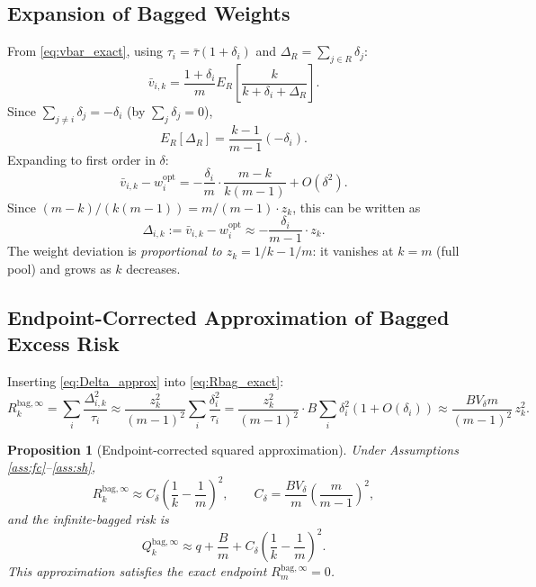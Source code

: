 \documentclass[12pt,a4paper]{article}
\newtheorem{proposition}{Proposition}
\theoremstyle{definition}
\begin{document}
\subsection{Expansion of Bagged Weights}

From \eqref{eq:vbar_exact}, using $\tau_i=\bar\tau(1+\delta_i)$ and
$\Delta_R=\sum_{j\in R}\delta_j$:
\begin{equation}
\bar v_{i,k} = \frac{1+\delta_i}{m}E_R\!\left[\frac{k}{k+\delta_i+\Delta_R}\right].
\end{equation}
Since $\sum_{j\neq i}\delta_j=-\delta_i$ (by $\sum_j\delta_j=0$),
\begin{equation}
E_R[\Delta_R] = \frac{k-1}{m-1}(-\delta_i).
\end{equation}
Expanding to first order in $\delta$:
\begin{equation}\label{eq:bagged_weight_expansion}
\bar v_{i,k} - w_i^{\mathrm{opt}}
= -\frac{\delta_i}{m}\cdot\frac{m-k}{k(m-1)} + O(\delta^2).
\end{equation}
Since $(m-k)/(k(m-1))=m/(m-1)\cdot z_k$, this can be written as
\begin{equation}\label{eq:Delta_approx}
\Delta_{i,k} := \bar v_{i,k} - w_i^{\mathrm{opt}}
\approx -\frac{\delta_i}{m-1}\cdot z_k.
\end{equation}
The weight deviation is \emph{proportional to $z_k=1/k-1/m$}: it vanishes
at $k=m$ (full pool) and grows as $k$ decreases.

\subsection{Endpoint-Corrected Approximation of Bagged Excess Risk}

Inserting \eqref{eq:Delta_approx} into \eqref{eq:Rbag_exact}:
\begin{equation}
R_k^{\mathrm{bag},\infty}
= \sum_i\frac{\Delta_{i,k}^2}{\tau_i}
\approx \frac{z_k^2}{(m-1)^2}\sum_i\frac{\delta_i^2}{\tau_i}
= \frac{z_k^2}{(m-1)^2}\cdot B\sum_i\delta_i^2(1+O(\delta_i))
\approx \frac{BV_\delta m}{(m-1)^2}\,z_k^2.
\end{equation}

\begin{proposition}[Endpoint-corrected squared approximation]\label{prop:smallhet}
Under Assumptions \ref{ass:fc}--\ref{ass:sh},
\begin{equation}\label{eq:Rapprox}
R_k^{\mathrm{bag},\infty} \approx C_\delta\!\left(\frac{1}{k}-\frac{1}{m}\right)^{\!2},
\qquad C_\delta = \frac{BV_\delta}{m}\!\left(\frac{m}{m-1}\right)^{\!2},
\end{equation}
and the infinite-bagged risk is
\begin{equation}\label{eq:Qbag_approx}
Q_k^{\mathrm{bag},\infty} \approx q + \frac{B}{m} + C_\delta\!\left(\frac{1}{k}-\frac{1}{m}\right)^{\!2}.
\end{equation}
This approximation satisfies the exact endpoint $R_m^{\mathrm{bag},\infty}=0$.
\end{proposition}
\end{document}
